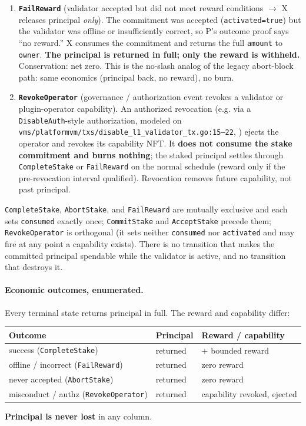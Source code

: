 \begin{enumerate}[leftmargin=2.4em,label=\textbf{T\arabic*.}]
\item \textbf{\texttt{FailReward}} \;(validator accepted but did not meet
  reward conditions $\to$ X releases principal \emph{only}). The
  commitment was accepted (\texttt{activated=true}) but the validator was
  offline or insufficiently correct, so P's outcome proof says
  ``no reward.'' X consumes the commitment and returns the full
  \texttt{amount} to \texttt{owner}. \textbf{The principal is returned in
  full; only the reward is withheld.} Conservation: net zero. This is the
  no-slash analog of the legacy abort-block path: same economics
  (principal back, no reward), no burn.

\item \textbf{\texttt{RevokeOperator}} \;(governance / authorization
  event revokes a validator or plugin-operator capability). An authorized
  revocation (e.g. via a \texttt{DisableAuth}-style authorization, modeled
  on \texttt{vms/platformvm/txs/\allowbreak disable\_l1\_validator\_tx.go:15--22},
  \IMPL{}) ejects the operator and revokes its capability NFT. It
  \textbf{does not consume the stake commitment and burns nothing}; the
  staked principal settles through \texttt{CompleteStake} or
  \texttt{FailReward} on the normal schedule (reward only if the
  pre-revocation interval qualified). Revocation removes future
  capability, not past principal.
\end{enumerate}

\noindent \texttt{CompleteStake}, \texttt{AbortStake}, and
\texttt{FailReward} are mutually exclusive and each sets
\texttt{consumed} exactly once; \texttt{CommitStake} and
\texttt{AcceptStake} precede them; \texttt{RevokeOperator} is orthogonal
(it sets neither \texttt{consumed} nor \texttt{activated} and may fire at
any point a capability exists). There is no transition that makes the
committed principal spendable while the validator is active, and no
transition that destroys it.

\paragraph{Economic outcomes, enumerated.} Every terminal state returns
principal in full. The reward and capability differ:
\begin{center}
\begin{tabular}{@{}lll@{}}
\toprule
Outcome & Principal & Reward / capability \\
\midrule
success (\texttt{CompleteStake})        & returned & $+$ bounded reward \\
offline / incorrect (\texttt{FailReward}) & returned & zero reward \\
never accepted (\texttt{AbortStake})     & returned & zero reward \\
misconduct / authz (\texttt{RevokeOperator}) & returned & capability revoked, ejected \\
\bottomrule
\end{tabular}
\end{center}
\noindent \textbf{Principal is never lost} in any column.

